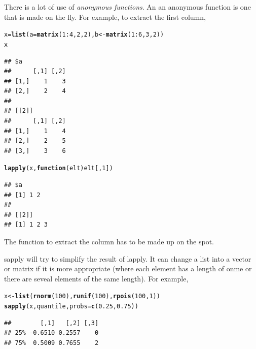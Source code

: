 \documentclass{article}\usepackage{graphicx, color}
\makeatletter
\newcommand{\hlfunctioncall}[1]{\textcolor[rgb]{0.501960784313725,0,0.329411764705882}{\textbf{#1}}}%
\newenvironment{kframe}{%
 \def\at@end@of@kframe{}%
 \ifinner\ifhmode%
  \def\at@end@of@kframe{\end{minipage}}%
  \begin{minipage}{\columnwidth}%
 \fi\fi%
 \def\FrameCommand##1{\hskip\@totalleftmargin \hskip-\fboxsep
 \colorbox{shadecolor}{##1}\hskip-\fboxsep
     \hskip-\linewidth \hskip-\@totalleftmargin \hskip\columnwidth}%
 \MakeFramed {\advance\hsize-\width
   \@totalleftmargin\z@ \linewidth\hsize
   \@setminipage}}%
 {\par\unskip\endMakeFramed%
 \at@end@of@kframe}
\newenvironment{knitrout}{}{} %
\makeatother
\begin{document}
There is a lot of use of \emph{anonymous functions}.  An an anonymous function is one that is made on the fly.  For example, to extract the first column, 
\begin{knitrout}
\color{fgcolor}\begin{kframe}
\begin{alltt}
x = \hlfunctioncall{list}(a = \hlfunctioncall{matrix}(1:4, 2, 2), b <- \hlfunctioncall{matrix}(1:6, 3, 2))
x
\end{alltt}
\begin{verbatim}
## $a
##      [,1] [,2]
## [1,]    1    3
## [2,]    2    4
## 
## [[2]]
##      [,1] [,2]
## [1,]    1    4
## [2,]    2    5
## [3,]    3    6
\end{verbatim}
\begin{alltt}
\hlfunctioncall{lapply}(x, \hlfunctioncall{function}(elt) elt[, 1])
\end{alltt}
\begin{verbatim}
## $a
## [1] 1 2
## 
## [[2]]
## [1] 1 2 3
\end{verbatim}
\end{kframe}
\end{knitrout}

The function to extract the column has to be made up on the spot. 

sapply will try to simplify the result of lapply.  It can change a list into a vector or matrix if it is more appropriate (where each element has a length of onme or there are seveal elements of the same length).  For example, 
\begin{knitrout}
\color{fgcolor}\begin{kframe}
\begin{alltt}
x <- \hlfunctioncall{list}(\hlfunctioncall{rnorm}(100), \hlfunctioncall{runif}(100), \hlfunctioncall{rpois}(100, 1))
\hlfunctioncall{sapply}(x, quantile, probs = \hlfunctioncall{c}(0.25, 0.75))
\end{alltt}
\begin{verbatim}
##        [,1]   [,2] [,3]
## 25% -0.6510 0.2557    0
## 75%  0.5009 0.7655    2
\end{verbatim}
\end{kframe}
\end{knitrout}
\end{document}
